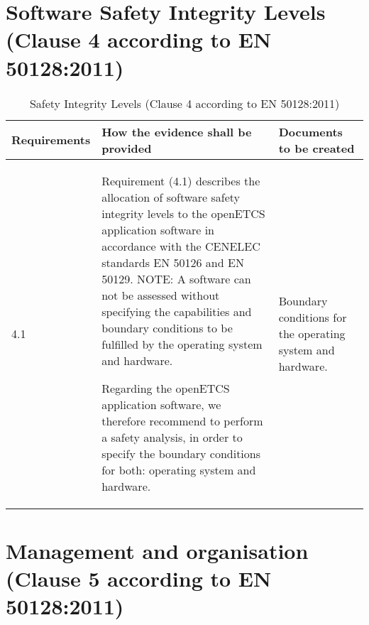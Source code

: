 \documentclass{template/openetcs_report}
\begin{document}
\section{Software Safety Integrity Levels (Clause 4 according to EN 50128:2011)}
\label{clause42}
{\footnotesize\sffamily\centering
\begin{longtable}{|p{2cm}|p{9cm}|p{3cm}|}
\caption{Safety Integrity Levels (Clause 4 according to EN 50128:2011)}\\
\hline
\bfseries Requirements & \bfseries How the evidence shall be provided & \bfseries Documents to be created\\
\hline
\hline
\endhead
\hline
\endfoot

4.1 & Requirement (4.1) describes the allocation of software safety integrity levels to the openETCS application software in accordance with the CENELEC standards EN 50126 and EN 50129.
\linebreak
\linebreak
NOTE:\linebreak 
A software can not be assessed without specifying the capabilities and boundary conditions to be fulfilled by the operating system and hardware. 

Regarding the openETCS application software, we therefore recommend to perform a safety analysis, in order to specify the boundary conditions for both: operating system and hardware.
& Boundary conditions for the operating system and hardware.\\ 
\hline
\end{longtable}}


\section{Management and organisation (Clause 5 according to EN 50128:2011)}
\label{clause52}
\end{document}
